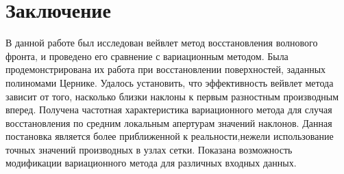 \documentclass{article}
\begin{document}
\section*{Заключение}
В данной работе был исследован вейвлет метод восстановления волнового фронта, и проведено его сравнение с вариационным методом. Была продемонстрирована их работа при восстановлении поверхностей, заданных полиномами Цернике. Удалось установить, что эффективность вейвлет метода зависит от того, насколько близки наклоны к первым разностным производным вперед. Получена частотная характеристика вариационного метода для случая восстановления по средним локальным апертурам значений наклонов. Данная постановка является более приближенной к реальности,нежели использование точных значений производных  в узлах сетки. Показана возможность модификации вариационного метода для различных входных данных.


\newpage

\end{document}
